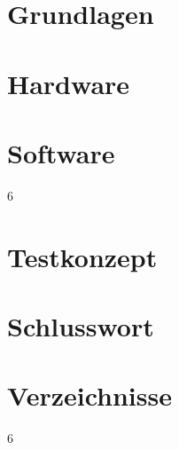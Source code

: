 \documentclass[10pt,a4paper,oneside]{99_fhnwreport}
\begin{document}
\begin{otherlanguage}{ngerman}
\section{Grundlagen}\label{sec:grundlagen}

\clearpage

\section{Hardware}\label{sec:hardware}

\clearpage

\section{Software}\label{sec:software}
6
\clearpage

\section{Testkonzept}\label{sec:testkonzept}

\clearpage

\section{Schlusswort}\label{sec:schlusswort}

\clearpage

\section{Verzeichnisse}\label{sec:Verzeichnisse}
6



\end{otherlanguage}
\end{document}
